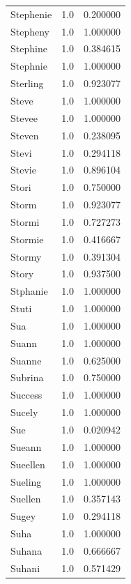 \documentclass[
  letterpaper,
  DIV=11,
  numbers=noendperiod]{scrreprt}
\begin{document}
\begin{tabular}{lrr}
Stephenie       &   1.0 &   0.200000 \\
Stepheny        &   1.0 &   1.000000 \\
Stephine        &   1.0 &   0.384615 \\
Stephnie        &   1.0 &   1.000000 \\
Sterling        &   1.0 &   0.923077 \\
Steve           &   1.0 &   1.000000 \\
Stevee          &   1.0 &   1.000000 \\
Steven          &   1.0 &   0.238095 \\
Stevi           &   1.0 &   0.294118 \\
Stevie          &   1.0 &   0.896104 \\
Stori           &   1.0 &   0.750000 \\
Storm           &   1.0 &   0.923077 \\
Stormi          &   1.0 &   0.727273 \\
Stormie         &   1.0 &   0.416667 \\
Stormy          &   1.0 &   0.391304 \\
Story           &   1.0 &   0.937500 \\
Stphanie        &   1.0 &   1.000000 \\
Stuti           &   1.0 &   1.000000 \\
Sua             &   1.0 &   1.000000 \\
Suann           &   1.0 &   1.000000 \\
Suanne          &   1.0 &   0.625000 \\
Subrina         &   1.0 &   0.750000 \\
Success         &   1.0 &   1.000000 \\
Sucely          &   1.0 &   1.000000 \\
Sue             &   1.0 &   0.020942 \\
Sueann          &   1.0 &   1.000000 \\
Sueellen        &   1.0 &   1.000000 \\
Sueling         &   1.0 &   1.000000 \\
Suellen         &   1.0 &   0.357143 \\
Sugey           &   1.0 &   0.294118 \\
Suha            &   1.0 &   1.000000 \\
Suhana          &   1.0 &   0.666667 \\
Suhani          &   1.0 &   0.571429 \\

\end{tabular}
\end{document}
